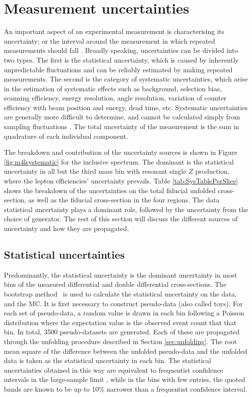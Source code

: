 \section{Measurement uncertainties}
\label{sec:uncertainties}
An important aspect of an experimental measurement is characterising its uncertainty; or the interval around the measurement in which repeated measurements should fall \cite{Kar:ab1be6}. Broadly speaking, uncertainties can be divided into two types. The first is the statistical uncertainty, which is caused by inherently unpredictable fluctuations and can be reliably estimated by making repeated measurements. The second is the category of systematic uncertainties, which arise in the estimation of systematic effects such as background, selection bias, scanning efficiency, energy resolution, angle resolution, variation of counter efficiency with beam position and energy, dead time, etc\cite{orear}. Systematic uncertainties are generally more difficult to determine, and cannot be calculated simply from sampling fluctuations \cite{reygers}. The total uncertainty of the measurement is the sum in quadrature of each individual component.

The breakdown and contribution of the uncertainty sources is shown in Figure \ref{fig:m4lsystematic} for the inclusive \mFourL spectrum. The dominant is the statistical uncertainty in all but the third mass bin with resonant single $Z$ production, where the lepton efficiencies' uncertainty prevails. Table \ref{tab:SysTablePerSlice} shows the breakdown of the uncertainties on the total fiducial unfolded cross-section, as well as the fiducial cross-section in the four \mFourL regions. The data statistical uncertainty plays a dominant role, followed by the uncertainty from the choice of generator. The rest of this section will discuss the different sources of uncertainty and how they are propagated.

\subsection{Statistical uncertainties} \label{ssec:statuncert}

Predominantly, the statistical uncertainty is the dominant uncertainty in most bins of the measured differential and double differential cross-sections. The bootstrap method~\cite{ATLAS_Bootstrap_2021} is used to calculate the statistical uncertainty on the data, and the MC. It is first necessary to construct pseudo-data (also called toys). For each set of pseudo-data, a random value is drawn in each bin following a Poisson distribution where the expectation value is the observed event count that that bin. In total, 3500 pseudo-datasets are generated. Each of these are propagated through the unfolding procedure described in Section \ref{sec:unfolding}. The root mean square of the difference between the unfolded pseudo-data and the unfolded data is taken as the statistical uncertainty in each bin. The statistical uncertainties obtained in this way are equivalent to frequentist confidence intervals in the large-sample limit  , while in the bins with few entries, the quoted bands are known to be up to 10\% narrower than a frequentist confidence interval.

